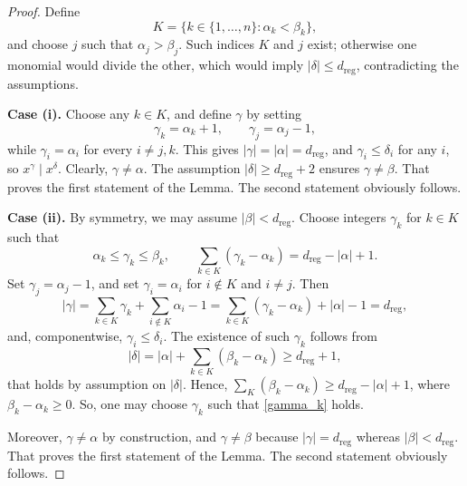 \documentclass[a4paper, 12pt, oneside, openright]{article}
\begin{document}
\begin{proof}
Define
\[
K=\{k\in\{1,\dots,n\}:\alpha_k<\beta_k\},
\]
and choose $j$ such that $\alpha_j>\beta_j$.
Such indices $K$ and $j$  exist; otherwise one monomial would divide the other, which would imply $|\delta|\le d_{\mathrm{reg}}$, contradicting the assumptions.

\noindent\textbf{Case (i).} Choose any $k\in K$, and define $\gamma$ by setting
\[
\gamma_k=\alpha_k+1,\qquad \gamma_j=\alpha_j-1,
\]
while $\gamma_i=\alpha_i$ for every $i \ne j,k$. This gives $|\gamma|=|\alpha|=d_{\mathrm{reg}}$, and $\gamma_i\le\delta_i$ for any $i$, so $x^\gamma\mid x^\delta$. Clearly, $\gamma\neq\alpha$. The assumption $|\delta| \ge d_{\mathrm{reg}}+2$ ensures $\gamma\ne\beta$. That proves the first statement of the Lemma. The second statement obviously follows.

\noindent\textbf{Case (ii).} By symmetry, we may assume $|\beta|<d_{\mathrm{reg}}$.
Choose integers $\gamma_k$ for $k\in K$ such that
\begin{equation}\label{gamma_k}
\alpha_k\le\gamma_k\le\beta_k,
\qquad
\sum_{k\in K}(\gamma_k-\alpha_k)=d_{\mathrm{reg}}-|\alpha|+1.
\end{equation}
Set $\gamma_j=\alpha_j-1$, and set  $\gamma_i=\alpha_i$ for $i\notin K$ and $i\ne j$. 
Then
\[
|\gamma|=\sum_{k \in K} \gamma_k+ \sum_{i \notin K} \alpha_i-1 =\sum_{k\in K}(\gamma_k-\alpha_k)+|\alpha|-1=d_{\mathrm{reg}},
\]
and, componentwise, $\gamma_i\le\delta_i$.
The existence of such  $\gamma_k$ follows from
\[
|\delta|=|\alpha|+\sum_{k\in K}(\beta_k-\alpha_k)\ge d_{\mathrm{reg}}+1,
\]
that holds by assumption on $|\delta|$.
Hence, $\sum_K (\beta_k - \alpha_k) \ge d_{\mathrm{reg}}-|\alpha|+1$, where $\beta_k - \alpha_k \ge 0$. So, one may choose $\gamma_k$ such that  \eqref{gamma_k} holds. 

Moreover, $\gamma\neq\alpha$ by construction, and $\gamma\neq\beta$ because $|\gamma|=d_{\mathrm{reg}}$ whereas $|\beta|<d_{\mathrm{reg}}$. That proves the first statement of the Lemma. The second statement obviously follows.
\end{proof}
\end{document}
